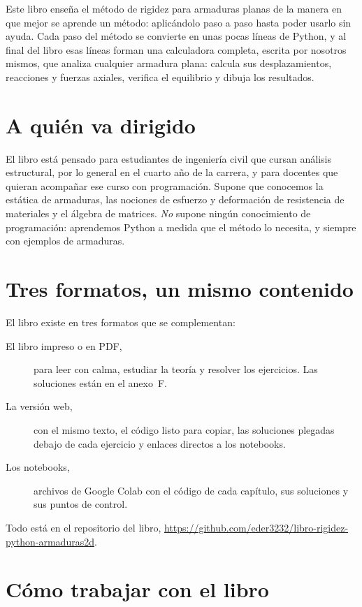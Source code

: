 
Este libro enseña el método de rigidez para armaduras planas de la manera en
que mejor se aprende un método: aplicándolo paso a paso hasta poder usarlo sin
ayuda. Cada paso del método se convierte en unas pocas líneas de Python, y al
final del libro esas líneas forman una calculadora completa, escrita por
nosotros mismos, que analiza cualquier armadura plana: calcula sus
desplazamientos, reacciones y fuerzas axiales, verifica el equilibrio y dibuja
los resultados.

\section*{A quién va dirigido}

El libro está pensado para estudiantes de ingeniería civil que cursan análisis
estructural, por lo general en el cuarto año de la carrera, y para docentes
que quieran acompañar ese curso con programación. Supone que conocemos la
estática de armaduras, las nociones de esfuerzo y deformación de resistencia
de materiales y el álgebra de matrices. \emph{No} supone ningún conocimiento
de programación: aprendemos Python a medida que el método lo necesita, y
siempre con ejemplos de armaduras.

\section*{Tres formatos, un mismo contenido}

El libro existe en tres formatos que se complementan:
\begin{description}
  \item[El libro impreso o en PDF,] para leer con calma, estudiar la teoría y
    resolver los ejercicios. Las soluciones están en el anexo~F.
  \item[La versión web,] con el mismo texto, el código listo para copiar, las
    soluciones plegadas debajo de cada ejercicio y enlaces directos a los
    notebooks.
  \item[Los notebooks,] archivos de Google Colab con el código de cada
    capítulo, sus soluciones y sus puntos de control.
\end{description}
Todo está en el repositorio del libro,
\url{https://github.com/eder3232/libro-rigidez-python-armaduras2d}.

\section*{Cómo trabajar con el libro}

